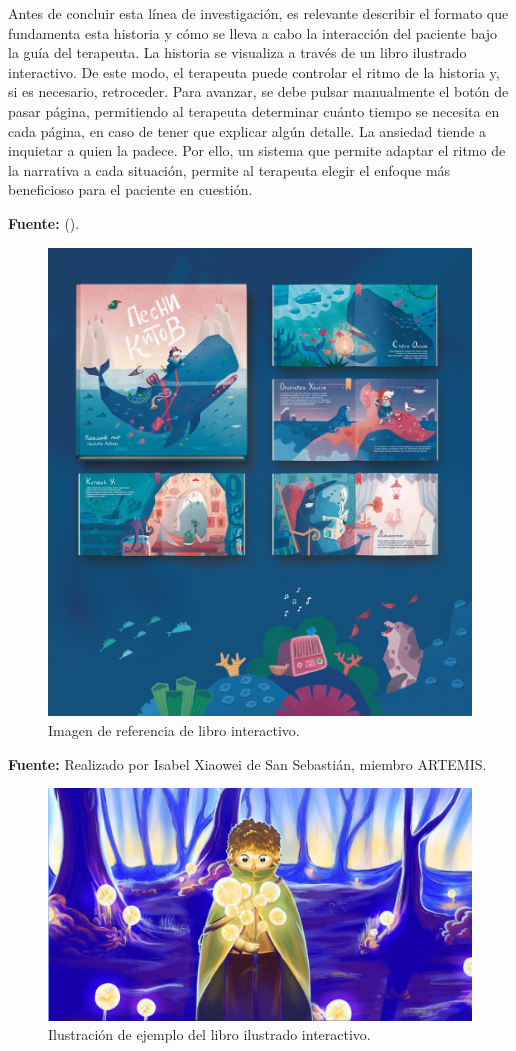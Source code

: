 Antes de concluir esta línea de investigación, es relevante describir el formato que fundamenta esta historia y cómo se lleva a cabo la interacción del paciente bajo la guía del terapeuta. La historia se visualiza a través de un libro ilustrado interactivo. De este modo, el terapeuta puede controlar el ritmo de la historia y, si es necesario, retroceder. Para avanzar, se debe pulsar manualmente el botón de pasar página, permitiendo al terapeuta determinar cuánto tiempo se necesita en cada página, en caso de tener que explicar algún detalle.
La ansiedad tiende a inquietar a quien la padece. Por ello, un sistema que permite adaptar el ritmo de la narrativa a cada situación, permite al terapeuta elegir el enfoque más beneficioso para el paciente en cuestión.

\begin{center}
	\textbf{Fuente:} \citeauthor{LORIRI:2018} (\citeyear{LORIRI:2018}).
	\vspace{-18pt}
\end{center}

\begin{figure}[h!]
	\centering
	\includegraphics[width=0.4\linewidth]{Figuras/Desarrollo/ImagenReferenciaLibro.jpg}
	\caption{Imagen de referencia de libro interactivo.}
	\label{fig:LoriRiBook}
\end{figure}

\begin{center}
	\textbf{Fuente:} Realizado por Isabel Xiaowei de San Sebastián, miembro ARTEMIS.
	\vspace{-18pt}
\end{center}

\begin{figure}[h!]
	\centering
	\includegraphics[width=0.5\linewidth]{Figuras/Desarrollo/IlustracionLibro.png}
	\caption{Ilustración de ejemplo del libro ilustrado interactivo.}
	\label{fig:BookIllustration}
\end{figure}

